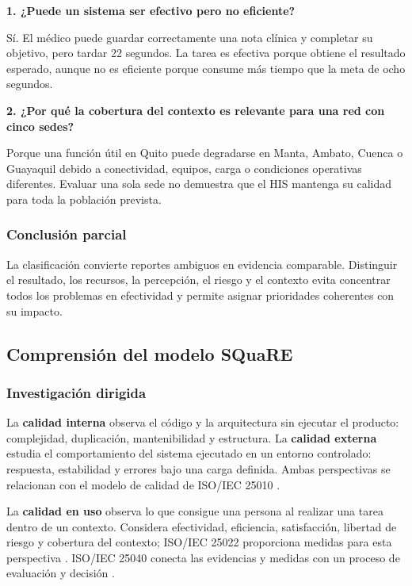 \textbf{1. ¿Puede un sistema ser efectivo pero no eficiente?}

Sí. El médico puede guardar correctamente una nota clínica y completar su objetivo, pero tardar 22 segundos. La tarea es efectiva porque obtiene el resultado esperado, aunque no es eficiente porque consume más tiempo que la meta de ocho segundos.

\textbf{2. ¿Por qué la cobertura del contexto es relevante para una red con cinco sedes?}

Porque una función útil en Quito puede degradarse en Manta, Ambato, Cuenca o Guayaquil debido a conectividad, equipos, carga o condiciones operativas diferentes. Evaluar una sola sede no demuestra que el HIS mantenga su calidad para toda la población prevista.

\subsubsection{Conclusión parcial}

La clasificación convierte reportes ambiguos en evidencia comparable. Distinguir el resultado, los recursos, la percepción, el riesgo y el contexto evita concentrar todos los problemas en efectividad y permite asignar prioridades coherentes con su impacto.

\subsection{Comprensión del modelo SQuaRE}


\subsubsection{Investigación dirigida}

La \textbf{calidad interna} observa el código y la arquitectura sin ejecutar el producto: complejidad, duplicación, mantenibilidad y estructura. La \textbf{calidad externa} estudia el comportamiento del sistema ejecutado en un entorno controlado: respuesta, estabilidad y errores bajo una carga definida. Ambas perspectivas se relacionan con el modelo de calidad de ISO/IEC 25010 \cite{iso25010}.

La \textbf{calidad en uso} observa lo que consigue una persona al realizar una tarea dentro de un contexto. Considera efectividad, eficiencia, satisfacción, libertad de riesgo y cobertura del contexto; ISO/IEC 25022 proporciona medidas para esta perspectiva \cite{iso25022}. ISO/IEC 25040 conecta las evidencias y medidas con un proceso de evaluación y decisión \cite{iso25040}.

